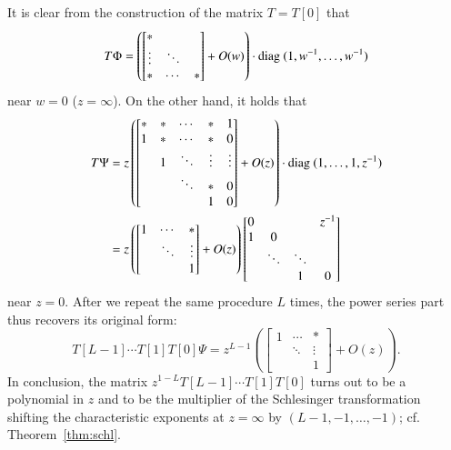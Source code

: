 \documentclass[12pt]{article}
\numberwithin{equation}{section}
\begin{document}
It is clear from the construction of the matrix $T=T[0]$
that
\[
T \Phi=
\left(\begin{bmatrix}
* &  &\\  
 \vdots&\ddots& \\ 
*& \cdots&*
\end{bmatrix}
+O(w)
\right) \cdot 
 {\rm diag \ } 
(1, w^{-1}, \ldots,w^{-1})
\]
near $w=0$ ($z=\infty$).
On the other hand, it holds that
\begin{align*}
T \Psi
&=
z
\left(
\begin{bmatrix}
*&*&\cdots&*&1 \\
1 & *&\cdots &*&0\\  
&1&\ddots& \vdots&\vdots  \\
&&\ddots& * & 0 \\
&&&1&0
\end{bmatrix} 
+O(z)
\right)
 \cdot 
 {\rm diag \ } 
 (1, \ldots,1, z^{-1})
\\
&=
z
\left(\begin{bmatrix}
1 & \cdots &*\\  
&\ddots& \vdots \\
&&1
\end{bmatrix} 
+O(z)
\right) 
\begin{bmatrix}
0&&& z^{-1}
\\
1 &  0&\\  
&\ddots& \ddots \\
&&1&0
\end{bmatrix} 
\end{align*}
near $z=0$.
After we repeat the same procedure $L$ times,
the power series part thus recovers its original form:
\[
T[L-1]\cdots T[1]T[0]\Psi
=
z^{L-1}
\left(\begin{bmatrix}
1 & \cdots &*\\  
&\ddots& \vdots \\
&&1
\end{bmatrix} 
+O(z)
\right). 
\] 
In conclusion, 
the matrix 
$z^{1-L} T[L-1]\cdots T[1]T[0]$
turns out to be a polynomial in $z$ and to be
the multiplier of the Schlesinger transformation
shifting the characteristic exponents at $z=\infty$ by
$(L-1,-1,\ldots,-1)$;
cf. Theorem~\ref{thm:schl}.
\end{document}

